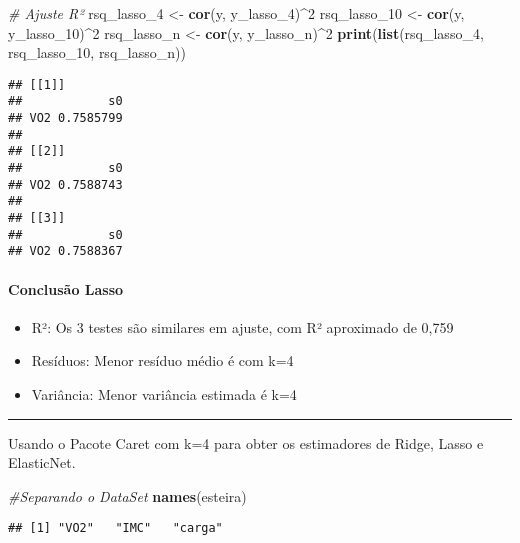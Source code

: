 \documentclass[]{article}
\newenvironment{Shaded}{\begin{snugshade}}{\end{snugshade}}
\newcommand{\CommentTok}[1]{\textcolor[rgb]{0.56,0.35,0.01}{\textit{#1}}}
\newcommand{\DecValTok}[1]{\textcolor[rgb]{0.00,0.00,0.81}{#1}}
\newcommand{\KeywordTok}[1]{\textcolor[rgb]{0.13,0.29,0.53}{\textbf{#1}}}
\newcommand{\NormalTok}[1]{#1}
\newcommand{\OperatorTok}[1]{\textcolor[rgb]{0.81,0.36,0.00}{\textbf{#1}}}
\newcommand{\StringTok}[1]{\textcolor[rgb]{0.31,0.60,0.02}{#1}}
\providecommand{\tightlist}{%
  \setlength{\itemsep}{0pt}\setlength{\parskip}{0pt}}
\let\oldparagraph\paragraph
\renewcommand{\paragraph}[1]{\oldparagraph{#1}\mbox{}}
\begin{document}
\begin{Shaded}
\begin{Highlighting}[]
\CommentTok{# Ajuste R²}
\NormalTok{rsq_lasso_}\DecValTok{4}\NormalTok{ <-}\StringTok{ }\KeywordTok{cor}\NormalTok{(y, y_lasso_}\DecValTok{4}\NormalTok{)}\OperatorTok{^}\DecValTok{2}
\NormalTok{rsq_lasso_}\DecValTok{10}\NormalTok{ <-}\StringTok{ }\KeywordTok{cor}\NormalTok{(y, y_lasso_}\DecValTok{10}\NormalTok{)}\OperatorTok{^}\DecValTok{2}
\NormalTok{rsq_lasso_n <-}\StringTok{ }\KeywordTok{cor}\NormalTok{(y, y_lasso_n)}\OperatorTok{^}\DecValTok{2}
\KeywordTok{print}\NormalTok{(}\KeywordTok{list}\NormalTok{(rsq_lasso_}\DecValTok{4}\NormalTok{, rsq_lasso_}\DecValTok{10}\NormalTok{, rsq_lasso_n))}
\end{Highlighting}
\end{Shaded}

\begin{verbatim}
## [[1]]
##            s0
## VO2 0.7585799
## 
## [[2]]
##            s0
## VO2 0.7588743
## 
## [[3]]
##            s0
## VO2 0.7588367
\end{verbatim}

\hypertarget{conclusuxe3o-lasso}{%
\paragraph{Conclusão Lasso}\label{conclusuxe3o-lasso}}

\begin{itemize}
\tightlist
\item
  R²: Os 3 testes são similares em ajuste, com R² aproximado de 0,759
\item
  Resíduos: Menor resíduo médio é com k=4
\item
  Variância: Menor variância estimada é k=4
\end{itemize}

\begin{center}\rule{0.5\linewidth}{0.5pt}\end{center}

Usando o Pacote Caret com k=4 para obter os estimadores de Ridge, Lasso
e ElasticNet.

\begin{Shaded}
\begin{Highlighting}[]
\CommentTok{#Separando o DataSet}
\KeywordTok{names}\NormalTok{(esteira)}
\end{Highlighting}
\end{Shaded}

\begin{verbatim}
## [1] "VO2"   "IMC"   "carga"
\end{verbatim}
\end{document}
